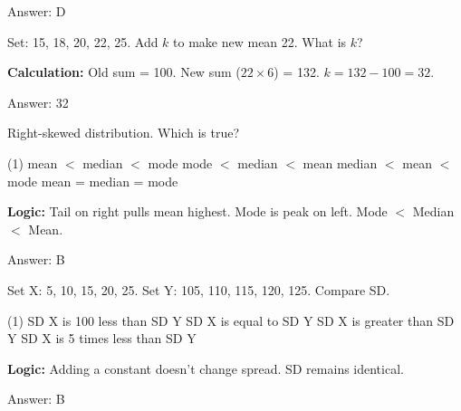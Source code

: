 \documentclass[11pt,paper=a4,answers]{exam}
\begin{document}
\begin{questions}
\begin{solution}
Answer: \colorbox{yellow!100}{D}
\end{solution}

\vspace{60pt}

\question
Set: 15, 18, 20, 22, 25. Add $k$ to make new mean 22. What is $k$?

\begin{solution}
\textbf{Calculation:} Old sum = 100. New sum ($22 \times 6$) = 132. $k = 132 - 100 = 32$.

\vspace{30pt}

Answer: \colorbox{yellow!100}{32}
\end{solution}

\vspace{60pt}

\question
Right-skewed distribution. Which is true?
\begin{tasks}(1)
    \task mean $<$ median $<$ mode
    \task mode $<$ median $<$ mean
    \task median $<$ mean $<$ mode
    \task mean = median = mode
\end{tasks}

\begin{solution}
\textbf{Logic:} Tail on right pulls mean highest. Mode is peak on left. Mode $<$ Median $<$ Mean.


\vspace{30pt}

Answer: \colorbox{yellow!100}{B}
\end{solution}

\vspace{60pt}

\question
Set X: 5, 10, 15, 20, 25. Set Y: 105, 110, 115, 120, 125. Compare SD.
\begin{tasks}(1)
    \task SD X is 100 less than SD Y
    \task SD X is equal to SD Y
    \task SD X is greater than SD Y
    \task SD X is 5 times less than SD Y
\end{tasks}

\begin{solution}
\textbf{Logic:} Adding a constant doesn't change spread. SD remains identical.

\vspace{30pt}

Answer: \colorbox{yellow!100}{B}
\end{solution}


\end{questions}
\end{document}
